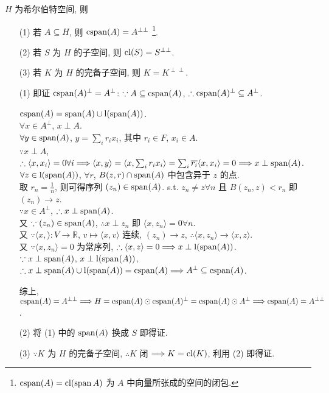 \documentclass{note}
\begin{document}
\begin{thm}[(课本定理 13.13)]
    $H$ 为希尔伯特空间, 则
    \begin{itemize}
        \item[(1)] 若 $A\subseteq H$, 则 $\operatorname{cspan}(A)=A^{\perp\perp}~$\footnote{$\operatorname{cspan}(A)=\operatorname{cl}(\operatorname{span}{A})$ 为 $A$ 中向量所张成的空间的闭包.}.
        \item[(2)] 若 $S$ 为 $H$ 的子空间, 则 $\operatorname{cl}(S)=S^{\perp\perp}$.
        \item[(3)] 若 $K$ 为 $H$ 的完备子空间, 则 $K=K^{\perp\perp}$.
    \end{itemize}
\end{thm}
\begin{pf}
    \begin{itemize}
        \item[(1)] 即证 $\operatorname{cspan}(A)^{\perp}=A^{\perp}$: $\because A\subseteq\operatorname{cspan}(A)$, $\therefore\operatorname{cspan}(A)^{\perp}\subseteq A^{\perp}$.

        $\operatorname{cspan}(A)=\operatorname{span}(A)\cup\operatorname{l}(\operatorname{span}(A))$.\\
        $\forall x\in A^{\perp}$, $x\perp A$.\\
        $\forall y\in\operatorname{span}(A)$, $y=\sum_ir_ix_i$, 其中 $r_i\in F$, $x_i\in A$.\\
        $\because x\perp A$, $\therefore\langle x,x_i\rangle=0\forall i\Longrightarrow\langle x,y\rangle=\langle x,\sum_ir_ix_i\rangle=\sum_i\overline{r_i}\langle x,x_i\rangle=0\Longrightarrow x\perp\operatorname{span}(A)$.\\
        $\forall z\in\operatorname{l}(\operatorname{span}(A))$, $\forall r$, $B(z,r)\cap\operatorname{span}(A)$ 中包含异于 $z$ 的点.\\
        取 $r_n=\frac{1}{n}$, 则可得序列 $(z_n)\in\operatorname{span}(A)$. s.t. $z_n\neq z\forall n$ 且 $B(z_n,z)<r_n$ 即 $(z_n)\rightarrow z$.\\
        $\because x\in A^{\perp}$, $\therefore x\perp\operatorname{span}(A)$.\\
        又 $\because(z_n)\in\operatorname{span}(A)$, $\therefore x\perp z_n$ 即 $\langle x,z_n\rangle=0\forall n$.\\
        又 $\because\langle x,\rangle:V\rightarrow\mathbb{R}$, $v\mapsto\langle x,v\rangle$ 连续, $(z_n)\rightarrow z$, $\therefore\langle x,z_n\rangle\rightarrow\langle x,z\rangle$.\\
        又 $\because\langle x,z_n\rangle=0$ 为常序列, $\therefore\langle x,z\rangle=0\Longrightarrow x\perp\operatorname{l}(\operatorname{span}(A))$.\\
        $\because x\perp\operatorname{span}(A)$, $x\perp\operatorname{l}(\operatorname{span}(A))$, $\therefore x\perp\operatorname{span}(A)\cup\operatorname{l}(\operatorname{span}(A))=\operatorname{cspan}(A)\Longrightarrow A^{\perp}\subseteq\operatorname{cspan}(A)$.

        综上, $\operatorname{cspan}(A)=A^{\perp\perp}\Longrightarrow H=\operatorname{cspan}(A)\odot\operatorname{cspan}(A)^{\perp}=\operatorname{cspan}(A)\odot A^{\perp}\Longrightarrow\operatorname{cspan}(A)=A^{\perp\perp}$.
        \item[(2)] 将 (1) 中的 $\operatorname{span}(A)$ 换成 $S$ 即得证.
        \item[(3)] $\because K$ 为 $H$ 的完备子空间, $\therefore K$ 闭 $\Longrightarrow K=\operatorname{cl}(K)$, 利用 (2) 即得证.
    \end{itemize}
\end{pf}
\end{document}
